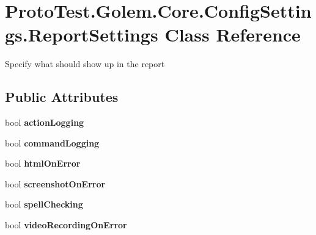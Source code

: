 \hypertarget{class_proto_test_1_1_golem_1_1_core_1_1_config_settings_1_1_report_settings}{\section{Proto\-Test.\-Golem.\-Core.\-Config\-Settings.\-Report\-Settings Class Reference}
\label{class_proto_test_1_1_golem_1_1_core_1_1_config_settings_1_1_report_settings}
}


Specify what should show up in the report  


\subsection*{Public Attributes}
\begin{DoxyCompactItemize}
\item 
\hypertarget{class_proto_test_1_1_golem_1_1_core_1_1_config_settings_1_1_report_settings_a369f9b153fcb85a43d00d01524035467}{bool {\bfseries action\-Logging}}\label{class_proto_test_1_1_golem_1_1_core_1_1_config_settings_1_1_report_settings_a369f9b153fcb85a43d00d01524035467}

\item 
\hypertarget{class_proto_test_1_1_golem_1_1_core_1_1_config_settings_1_1_report_settings_aba6eb0e1fbf1bc38209516e1412a1cd9}{bool {\bfseries command\-Logging}}\label{class_proto_test_1_1_golem_1_1_core_1_1_config_settings_1_1_report_settings_aba6eb0e1fbf1bc38209516e1412a1cd9}

\item 
\hypertarget{class_proto_test_1_1_golem_1_1_core_1_1_config_settings_1_1_report_settings_abe8540b27e25a6d72d2a0aadeaec9933}{bool {\bfseries html\-On\-Error}}\label{class_proto_test_1_1_golem_1_1_core_1_1_config_settings_1_1_report_settings_abe8540b27e25a6d72d2a0aadeaec9933}

\item 
\hypertarget{class_proto_test_1_1_golem_1_1_core_1_1_config_settings_1_1_report_settings_a6d80d775fb209b492f7426681c11208b}{bool {\bfseries screenshot\-On\-Error}}\label{class_proto_test_1_1_golem_1_1_core_1_1_config_settings_1_1_report_settings_a6d80d775fb209b492f7426681c11208b}

\item 
\hypertarget{class_proto_test_1_1_golem_1_1_core_1_1_config_settings_1_1_report_settings_a53d0ba2f155d47782c79caefce73a0f5}{bool {\bfseries spell\-Checking}}\label{class_proto_test_1_1_golem_1_1_core_1_1_config_settings_1_1_report_settings_a53d0ba2f155d47782c79caefce73a0f5}

\item 
\hypertarget{class_proto_test_1_1_golem_1_1_core_1_1_config_settings_1_1_report_settings_a9dcf6509b21018ef54d7d2d1405f4dd2}{bool {\bfseries video\-Recording\-On\-Error}}\label{class_proto_test_1_1_golem_1_1_core_1_1_config_settings_1_1_report_settings_a9dcf6509b21018ef54d7d2d1405f4dd2}

\end{DoxyCompactItemize}


